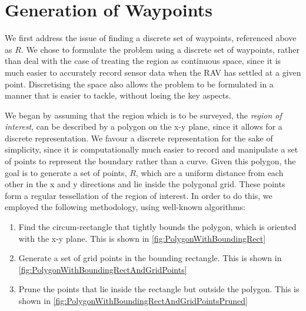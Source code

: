 
\section{Generation of Waypoints}
We first address the issue of finding a discrete set of waypoints, referenced above as $R$. We chose to formulate the problem using a discrete set of waypoints, rather than deal with the case of treating the region as continuous space, since it is much easier to accurately record sensor data when the RAV has settled at a given point. Discretising the space also allows the problem to be formulated in a manner that is easier to tackle, without losing the key aspects.


We began by assuming that the region which is to be surveyed, the \textit{region of interest}, can be described by a polygon on the x-y plane, since it allows for a discrete representation. We favour a discrete representation for the sake of simplicity, since it is computationally much easier to record and manipulate a set of points to represent the boundary rather than a curve. Given this polygon, the goal is to generate a set of points, $R$, which are a uniform distance from each other in the x and y directions and lie inside the polygonal grid. These points form a regular tessellation of the region of interest. In order to do this, we employed the following methodology, using well-known algorithms:
\begin{enumerate}
    \item Find the circum-rectangle that tightly bounds the polygon, which is oriented with the x-y plane. This is shown in \ref{fig:PolygonWithBoundingRect}
    \item Generate a set of grid points in the bounding rectangle. This is shown in \ref{fig:PolygonWithBoundingRectAndGridPoints}
    \item Prune the points that lie inside the rectangle but outside the polygon. This is shown in \ref{fig:PolygonWithBoundingRectAndGridPointsPruned}
\end{enumerate}


